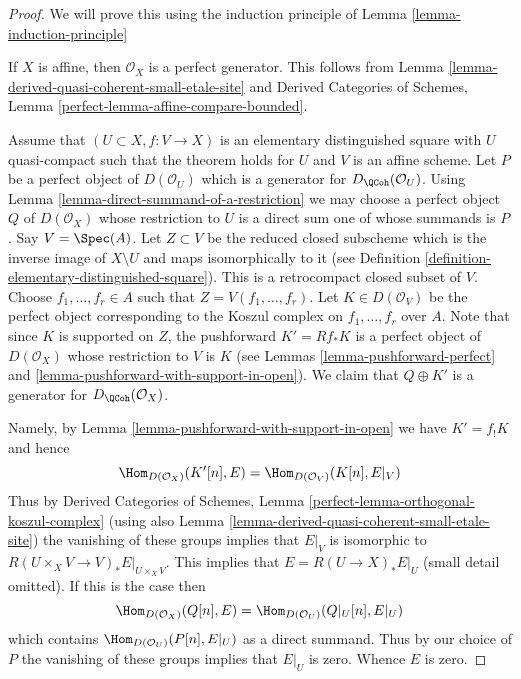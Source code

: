 \begin{proof}
We will prove this using the induction principle of
Lemma \ref{lemma-induction-principle}

\medskip\noindent
If $X$ is affine, then $\mathcal{O}_X$ is a perfect generator.
This follows from Lemma \ref{lemma-derived-quasi-coherent-small-etale-site}
and
Derived Categories of Schemes,
Lemma \ref{perfect-lemma-affine-compare-bounded}.

\medskip\noindent
Assume that $(U \subset X, f : V \to X)$ is an elementary distinguished
square with $U$ quasi-compact such that the theorem holds for $U$ and $V$
is an affine scheme.
Let $P$ be a perfect object of $D(\mathcal{O}_U)$ which is a generator
for $D_\QCoh(\mathcal{O}_U)$. Using
Lemma \ref{lemma-direct-summand-of-a-restriction} we may
choose a perfect object
$Q$ of $D(\mathcal{O}_X)$ whose restriction to $U$ is a direct sum one
of whose summands is $P$. Say $V = \Spec(A)$. Let $Z \subset V$
be the reduced closed subscheme which is the inverse image of
$X \setminus U$ and maps isomorphically to it
(see Definition \ref{definition-elementary-distinguished-square}).
This is a retrocompact closed subset of $V$.
Choose $f_1, \ldots, f_r \in A$ such that
$Z = V(f_1, \ldots, f_r)$. Let $K \in D(\mathcal{O}_V)$ be the perfect
object corresponding to the Koszul complex on $f_1, \ldots, f_r$ over $A$.
Note that since $K$ is supported on $Z$, the pushforward
$K' = Rf_*K$ is a perfect object of $D(\mathcal{O}_X)$ whose
restriction to $V$ is $K$ (see Lemmas \ref{lemma-pushforward-perfect}
and \ref{lemma-pushforward-with-support-in-open}).
We claim that $Q \oplus K'$ is a generator for
$D_\QCoh(\mathcal{O}_X)$.

\medskip\noindent
Namely, by Lemma \ref{lemma-pushforward-with-support-in-open}
we have $K' =  f_! K$ and hence
$$
\Hom_{D(\mathcal{O}_X)}(K'[n], E) = \Hom_{D(\mathcal{O}_V)}(K[n], E|_V)
$$
Thus by
Derived Categories of Schemes,
Lemma \ref{perfect-lemma-orthogonal-koszul-complex}
(using also
Lemma \ref{lemma-derived-quasi-coherent-small-etale-site})
the vanishing of these groups implies that $E|_V$ is isomorphic to
$R(U \times_X V \to V)_*E|_{U \times_X V}$. This implies that
$E = R(U \to X)_*E|_U$ (small detail omitted). If this is the case then
$$
\Hom_{D(\mathcal{O}_X)}(Q[n], E) = \Hom_{D(\mathcal{O}_U)}(Q|_U[n], E|_U)
$$
which contains $\Hom_{D(\mathcal{O}_U)}(P[n], E|_U)$ as a direct summand.
Thus by our choice of $P$ the vanishing of these groups implies that $E|_U$
is zero. Whence $E$ is zero.
\end{proof}








